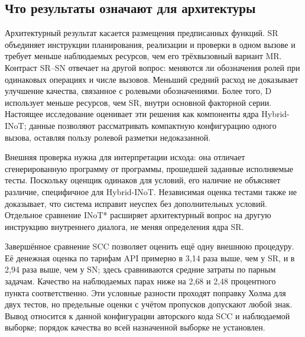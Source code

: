 \subsection{Что результаты означают для архитектуры}
Архитектурный результат касается размещения предписанных функций. SR объединяет инструкции планирования, реализации и проверки в одном вызове и требует меньше наблюдаемых ресурсов, чем его трёхвызовный вариант MR. Контраст SR--SN отвечает на другой вопрос: меняются ли обозначения ролей при одинаковых операциях и числе вызовов. Меньший средний расход не доказывает улучшение качества, связанное с ролевыми обозначениями. Более того, D использует меньше ресурсов, чем SR, внутри основной факторной серии. Настоящее исследование оценивает эти решения как компоненты ядра Hybrid-INoT; данные позволяют рассматривать компактную конфигурацию одного вызова, оставляя пользу ролевой разметки недоказанной.

Внешняя проверка нужна для интерпретации исхода: она отличает сгенерированную программу от программы, прошедшей заданные исполняемые тесты. Поскольку оценщик одинаков для условий, его наличие не объясняет различие, специфичное для Hybrid-INoT. Независимая оценка тестами также не доказывает, что система исправит неуспех без дополнительных условий. Отдельное сравнение INoT* расширяет архитектурный вопрос на другую инструкцию внутреннего диалога, не меняя определения ядра SR.

Завершённое сравнение SCC позволяет оценить ещё одну внешнюю процедуру. Её денежная оценка по тарифам API примерно в 3{,}14 раза выше, чем у SR, и в 2{,}94 раза выше, чем у SN; здесь сравниваются средние затраты по парным задачам. Качество на наблюдаемых парах ниже на 2{,}68 и 2{,}48 процентного пункта соответственно. Эти условные разности проходят поправку Холма для двух тестов, но предельные оценки с учётом пропусков допускают любой знак. Вывод относится к данной конфигурации авторского кода SCC и наблюдаемой выборке; порядок качества во всей назначенной выборке не установлен.

